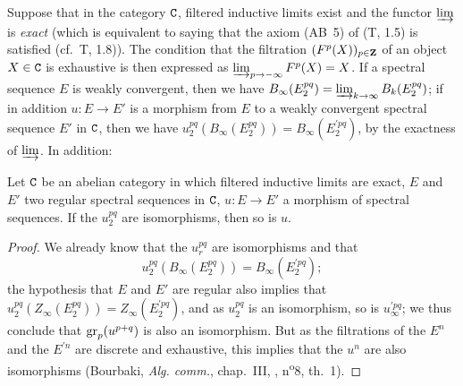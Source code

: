 \begin{env}[11.1.4]
\label{0.11.1.4}
Suppose that in the category $\mathtt{C}$, filtered inductive limits exist and the functor $\varinjlim$ is \emph{exact} (which is equivalent to saying that the axiom (AB~5) of (T, 1.5) is satisfied (cf.~T, 1.8)).
The condition that the filtration $(F^p(X))_{p\in\mathbf{Z}}$ of an object $X\in\mathtt{C}$ is exhaustive is then expressed as $\varinjlim_{p\to-\infty}F^p(X)=X$.
If a spectral sequence $E$ is weakly convergent, then we have $B_\infty(E_2^{pq})=\varinjlim_{k\to\infty}B_k(E_2^{pq})$; if in addition $u:E\to E'$ is a morphism from $E$ to a weakly convergent spectral sequence $E'$ in $\mathtt{C}$, then we have $u_2^{pq}(B_\infty(E_2^{pq}))=B_\infty(E_2^{\prime pq})$, by the exactness of $\varinjlim$.
In addition:
\end{env}

\begin{prop}[11.1.5]
\label{0.11.1.5}
Let $\mathtt{C}$ be an abelian category in which filtered inductive limits are exact, $E$ and $E'$ two regular spectral sequences in $\mathtt{C}$, $u:E\to E'$ a morphism of spectral sequences.
If the $u_2^{pq}$ are isomorphisms, then so is $u$.
\end{prop}

\begin{proof}
\label{proof-0.11.1.5}
We already know  that the $u_r^{pq}$ are isomorphisms and that
\[
  u_2^{pq}(B_\infty(E_2^{pq}))=B_\infty(E_2^{\prime pq});
\]
the hypothesis that $E$ and $E'$ are regular also implies that $u_2^{pq}(Z_\infty(E_2^{pq}))=Z_\infty(E_2^{\prime pq})$, and as $u_2^{pq}$ is an isomorphism, so is $u_\infty^{\prime pq}$; we thus conclude that ${\mathop{\mathrm{gr}}\nolimits}_p(u^{p+q})$ is also an isomorphism.
But as the filtrations of the $E^n$ and the $E^{\prime n}$ are discrete and exhaustive, this implies that the $u^n$ are also isomorphisms (Bourbaki, \emph{Alg. comm.}, chap.~III, , n\textsuperscript{o}8, th.~1).
\end{proof}






